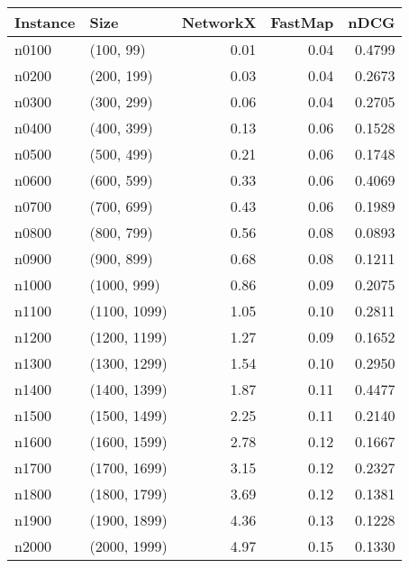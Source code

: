 \begin{tabular}{llrrr}
\toprule
Instance &         Size &  NetworkX &  FastMap &   nDCG \\
\midrule
   n0100 &    (100, 99) &      0.01 &     0.04 & 0.4799 \\
   n0200 &   (200, 199) &      0.03 &     0.04 & 0.2673 \\
   n0300 &   (300, 299) &      0.06 &     0.04 & 0.2705 \\
   n0400 &   (400, 399) &      0.13 &     0.06 & 0.1528 \\
   n0500 &   (500, 499) &      0.21 &     0.06 & 0.1748 \\
   n0600 &   (600, 599) &      0.33 &     0.06 & 0.4069 \\
   n0700 &   (700, 699) &      0.43 &     0.06 & 0.1989 \\
   n0800 &   (800, 799) &      0.56 &     0.08 & 0.0893 \\
   n0900 &   (900, 899) &      0.68 &     0.08 & 0.1211 \\
   n1000 &  (1000, 999) &      0.86 &     0.09 & 0.2075 \\
   n1100 & (1100, 1099) &      1.05 &     0.10 & 0.2811 \\
   n1200 & (1200, 1199) &      1.27 &     0.09 & 0.1652 \\
   n1300 & (1300, 1299) &      1.54 &     0.10 & 0.2950 \\
   n1400 & (1400, 1399) &      1.87 &     0.11 & 0.4477 \\
   n1500 & (1500, 1499) &      2.25 &     0.11 & 0.2140 \\
   n1600 & (1600, 1599) &      2.78 &     0.12 & 0.1667 \\
   n1700 & (1700, 1699) &      3.15 &     0.12 & 0.2327 \\
   n1800 & (1800, 1799) &      3.69 &     0.12 & 0.1381 \\
   n1900 & (1900, 1899) &      4.36 &     0.13 & 0.1228 \\
   n2000 & (2000, 1999) &      4.97 &     0.15 & 0.1330 \\
\bottomrule
\end{tabular}
